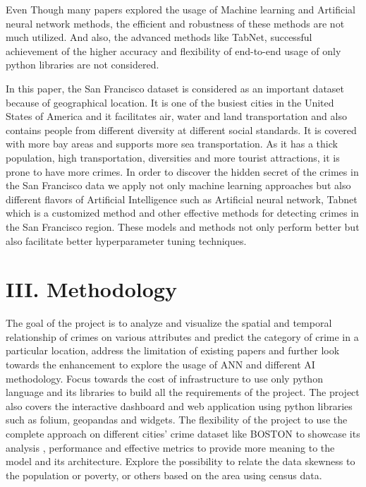 \documentclass[11 pt,conference,final,]{IEEEtran}
\begin{document}
Even Though many papers explored the usage of Machine learning and
Artificial neural network methods, the efficient and robustness of these
methods are not much utilized. And also, the advanced methods like
TabNet, successful achievement of the higher accuracy and flexibility of
end-to-end usage of only python libraries are not considered.

In this paper, the San Francisco dataset is considered as an important
dataset because of geographical location. It is one of the busiest
cities in the United States of America and it facilitates air, water and
land transportation and also contains people from different diversity at
different social standards. It is covered with more bay areas and
supports more sea transportation. As it has a thick population, high
transportation, diversities and more tourist attractions, it is prone to
have more crimes. In order to discover the hidden secret of the crimes
in the San Francisco data we apply not only machine learning approaches
but also different flavors of Artificial Intelligence such as Artificial
neural network, Tabnet which is a customized method and other effective
methods for detecting crimes in the San Francisco region. These models
and methods not only perform better but also facilitate better
hyperparameter tuning techniques.

\section{III. Methodology}\label{iii.-methodology}

The goal of the project is to analyze and visualize the spatial and
temporal relationship of crimes on various attributes and predict the
category of crime in a particular location, address the limitation of
existing papers and further look towards the enhancement to explore the
usage of ANN and different AI methodology. Focus towards the cost of
infrastructure to use only python language and its libraries to build
all the requirements of the project. The project also covers the
interactive dashboard and web application using python libraries such as
folium, geopandas and widgets. The flexibility of the project to use the
complete approach on different cities' crime dataset like BOSTON to
showcase its analysis , performance and effective metrics to provide
more meaning to the model and its architecture. Explore the possibility
to relate the data skewness to the population or poverty, or others
based on the area using census data.
\end{document}
